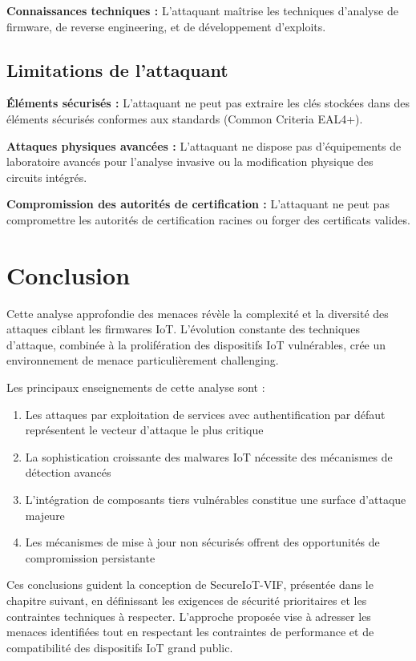 \textbf{Connaissances techniques :} L'attaquant maîtrise les techniques d'analyse de firmware, de reverse engineering, et de développement d'exploits.

\subsection{Limitations de l'attaquant}

\textbf{Éléments sécurisés :} L'attaquant ne peut pas extraire les clés stockées dans des éléments sécurisés conformes aux standards (Common Criteria EAL4+).

\textbf{Attaques physiques avancées :} L'attaquant ne dispose pas d'équipements de laboratoire avancés pour l'analyse invasive ou la modification physique des circuits intégrés.

\textbf{Compromission des autorités de certification :} L'attaquant ne peut pas compromettre les autorités de certification racines ou forger des certificats valides.

\section{Conclusion}

Cette analyse approfondie des menaces révèle la complexité et la diversité des attaques ciblant les firmwares IoT. L'évolution constante des techniques d'attaque, combinée à la prolifération des dispositifs IoT vulnérables, crée un environnement de menace particulièrement challenging.

Les principaux enseignements de cette analyse sont :

\begin{enumerate}
    \item Les attaques par exploitation de services avec authentification par défaut représentent le vecteur d'attaque le plus critique
    \item La sophistication croissante des malwares IoT nécessite des mécanismes de détection avancés
    \item L'intégration de composants tiers vulnérables constitue une surface d'attaque majeure
    \item Les mécanismes de mise à jour non sécurisés offrent des opportunités de compromission persistante
\end{enumerate}

Ces conclusions guident la conception de SecureIoT-VIF, présentée dans le chapitre suivant, en définissant les exigences de sécurité prioritaires et les contraintes techniques à respecter. L'approche proposée vise à adresser les menaces identifiées tout en respectant les contraintes de performance et de compatibilité des dispositifs IoT grand public.
